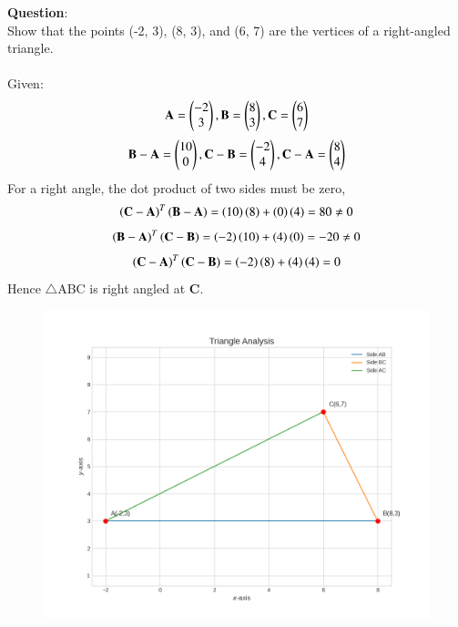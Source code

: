 \documentclass[journal]{IEEEtran}
\begin{document}
\textbf{Question}:\\
Show that the points (-2, 3), (8, 3), and (6, 7) are the vertices of a right-angled triangle. \\ 
\solution \\
Given:
\begin{align}
 \mathbf{A}=\begin{pmatrix}-2\\3\end{pmatrix},
 \mathbf{B}=\begin{pmatrix}8\\3\end{pmatrix},
 \mathbf{C}=\begin{pmatrix}6\\7\end{pmatrix}
\end{align} 
\begin{align}
   \mathbf{B}-\mathbf{A}=\begin{pmatrix}10\\0\end{pmatrix},
   \mathbf{C}-\mathbf{B}=\begin{pmatrix}-2\\4\end{pmatrix},
   \mathbf{C}-\mathbf{A}=\begin{pmatrix}8\\4\end{pmatrix}
\end{align}
For a right angle, the dot product of two sides must be zero,
\begin{align}
\left(\mathbf{C}-\mathbf{A}\right)^T\left(\mathbf{B}-\mathbf{A}\right)=\left(10\right)\left(8\right)+\left(0\right)\left(4\right)=80\neq 0
\end{align}
\begin{align}
\left(\mathbf{B}-\mathbf{A}\right)^T\left(\mathbf{C}-\mathbf{B}\right)=\left(-2\right)\left(10\right)+\left(4\right)\left(0\right)=-20\neq 0
\end{align}
\begin{align}
\left(\mathbf{C}-\mathbf{A}\right)^T\left(\mathbf{C}-\mathbf{B}\right)=\left(-2\right)\left(8\right)+\left(4\right)\left(4\right)=0
\end{align}
Hence $\triangle$ABC is right angled at \textbf{C}.
\newpage
\begin{figure}
    \centering
    \includegraphics[width=1\columnwidth]{figs/Figure_1.png}
    \caption{}
    \label{fig:placeholder}
\end{figure}
\end{document}
